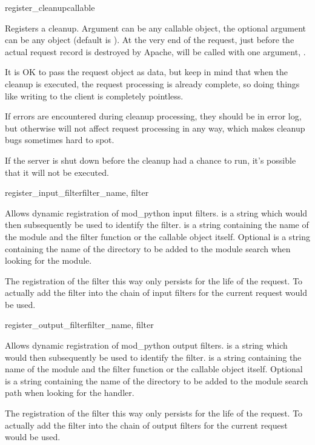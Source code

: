 \begin{methoddesc}[request]{register_cleanup}{callable}

  Registers a cleanup. Argument  can be any callable
  object, the optional argument  can be any object (default is
  ). At the very end of the request, just before the actual
  request record is destroyed by Apache,  will be called
  with one argument, .

  It is OK to pass the request object as data, but keep in mind that
  when the cleanup is executed, the request processing is already
  complete, so doing things like writing to the client is completely
  pointless. 

  If errors are encountered during cleanup processing, they should be in
  error log, but otherwise will not affect request processing in any
  way, which makes cleanup bugs sometimes hard to spot.

  If the server is shut down before the cleanup had a chance to run,
  it's possible that it will not be executed.

\end{methoddesc}

\begin{methoddesc}[request]{register_input_filter}{filter_name, filter}

  Allows dynamic registration of mod_python input filters. 
  is a string which would then subsequently be used to identify the filter.
   is a string containing the name of the module and the filter
  function or the callable object itself.  Optional  is a string
  containing the name of the directory to be added to the module search when
  looking for the module.

  The registration of the filter this way only persists for the life of the
  request. To actually add the filter into the chain of input filters for
  the current request  would be used.

\end{methoddesc}

\begin{methoddesc}[request]{register_output_filter}{filter_name, filter}

  Allows dynamic registration of mod_python output filters. 
  is a string which would then subsequently be used to identify the filter.
   is a string containing the name of the module and the filter
  function or the callable object itself. Optional  is a string
  containing the name of the directory to be added to the module search
  path when looking for the handler.

  The registration of the filter this way only persists for the life of the
  request. To actually add the filter into the chain of output filters for
  the current request  would be used.

\end{methoddesc}

